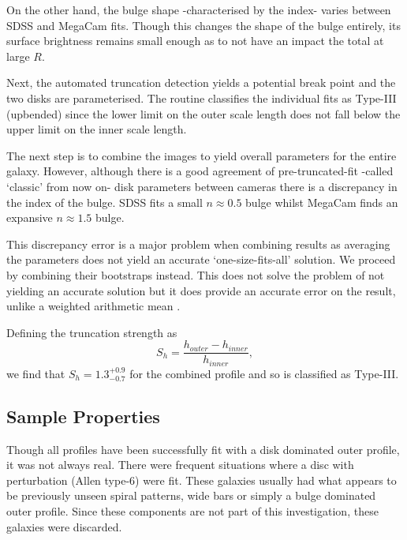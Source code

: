 On the other hand, the bulge shape -characterised by the \sersic index- varies between SDSS and MegaCam fits. Though this changes the shape of the bulge entirely, its surface brightness remains small enough as to not have an impact the total at large $R$.

Next, the automated truncation detection yields a potential break point and the two disks are parameterised. The routine classifies the individual fits as Type-III (upbended) since the lower limit on the outer scale length does not fall below the upper limit on the inner scale length. 

The next step is to combine the images to yield overall parameters for the entire galaxy. However, although there is a good agreement of pre-truncated-fit -called `classic' from now on- disk parameters between cameras there is a discrepancy in the \sersic index of the bulge. SDSS fits a small $n\approx 0.5$ bulge whilst MegaCam finds an expansive $n\approx 1.5$ bulge. 

This discrepancy error is a major problem when combining results as averaging the parameters does not yield an accurate `one-size-fits-all' solution. We proceed by combining their bootstraps instead. This does not solve the problem of not yielding an accurate solution but it does provide an accurate error on the result, unlike a weighted arithmetic mean \citep{andrae_error_2010}.

Defining the truncation strength as 
\begin{equation}
	S_h =  \frac{h_{outer} - h_{inner}}{h_{inner}},
\end{equation}
we find that $S_h = 1.3^{+0.9}_{-0.7}$ for the combined profile and so is classified as Type-III.




\subsection{Sample Properties}
Though all profiles have been successfully fit with a disk dominated outer profile, it was not always real. There were frequent situations where a disc with perturbation (Allen type-6) were fit. These galaxies usually had what appears to be previously unseen spiral patterns, wide bars or simply a bulge dominated outer profile. Since these components are not part of this investigation, these galaxies were discarded.

